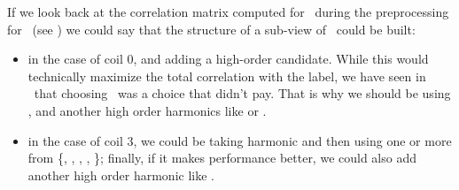 If we look back at the correlation matrix computed for \cnmod\ during the preprocessing for \qrp\
(see ) we could say that the structure of a sub-view of \cnmod\ could be built:
\begin{itemize}
	\item in the case of coil $0$, \cnmod[2] and adding a high-order candidate.
	      While this would technically maximize the total correlation with the label, we have
	      seen in \qrp\ that choosing \cnmod[2]\ was a choice that didn't pay. That
	      is why we should be using \cnmod[3], \cnmod[6] and another high order harmonics like \cnmod[9] or \cnmod[11].
	\item in the case of coil $3$, we could be taking harmonic \cnmod[1] and then using one or
	      more from \{\cnmod[4], \cnmod[5], \cnmod[6], \cnmod[7], \cnmod[8]\}; finally, if it makes performance better, we could also add
	      another high order harmonic like \cnmod[10].
\end{itemize}
